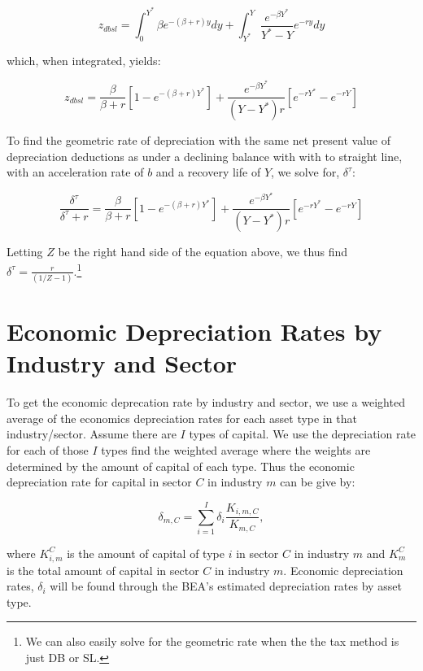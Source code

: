 \documentclass[article,11pt,letterpaper,fleqn]{article}
\theoremstyle{definition}
\numberwithin{equation}{section}
\begin{document}
\begin{equation}
z_{dbsl}=\int_{0}^{Y^{*}}\beta e^{-(\beta+r)y}dy+\int_{Y^{*}}^{Y}\frac{e^{-\beta Y^{*}}}{Y^{*}-Y}e^{-ry}dy
\end{equation}

\noindent\noindent which, when integrated, yields:

\begin{equation}
z_{dbsl}=\frac{\beta}{\beta+r}\left[1-e^{-(\beta+r)Y^{*}}\right]+\frac{e^{-\beta Y^{*}}}{(Y-Y^{*})r}\left[e^{-rY^{*}}-e^{-rY}\right]
\end{equation}

\noindent\noindent To find the geometric rate of depreciation with the same net present value of depreciation deductions as under a declining balance with with to straight line, with an acceleration rate of $b$ and a recovery life of $Y$, we solve for, $\delta^{\tau}$:

\begin{equation}
\frac{\delta^{\tau}}{\delta^{\tau}+r}=\frac{\beta}{\beta+r}\left[1-e^{-(\beta+r)Y^{*}}\right]+\frac{e^{-\beta Y^{*}}}{(Y-Y^{*})r}\left[e^{-rY^{*}}-e^{-rY}\right]
\end{equation}

\noindent\noindent Letting $Z$ be the right hand side of the equation above, we thus find $\delta^{\tau}=\frac{r}{(1/Z-1)}$.\footnote{We can also easily solve for the geometric rate when the the tax method is just DB or SL.}

\section{Economic Depreciation Rates by Industry and Sector}
\label{sec:econ_rates_sector}

To get the economic deprecation rate by industry and sector, we use a weighted average of the economics depreciation rates for each asset type in that industry/sector.  Assume there are $I$ types of capital.  We use the depreciation rate for each of those $I$ types find the weighted average where the weights are determined by the amount of capital of each type.  Thus the economic depreciation rate for capital in sector $C$ in industry $m$ can be give by:

\begin{equation}
\label{eqn:econ_deprec}
\delta_{m,C}=\sum_{i=1}^{I}\delta_{i}\frac{K_{i,m,C}}{K_{m,C}},
\end{equation}

\noindent\noindent where $K^{C}_{i,m}$ is the amount of capital of type $i$ in sector $C$ in industry $m$ and $K^{C}_{m}$ is the total amount of capital in sector $C$ in industry $m$.  Economic depreciation rates, $\delta_{i}$ will be found through the BEA's estimated depreciation rates by asset type.
\end{document}
